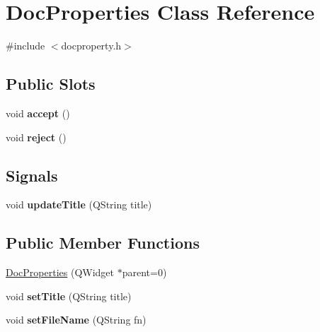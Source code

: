 \hypertarget{classDocProperties}{
\section{DocProperties Class Reference}
\label{classDocProperties}
}


{\ttfamily \#include $<$docproperty.h$>$}

\subsection*{Public Slots}
\begin{DoxyCompactItemize}
\item 
\hypertarget{classDocProperties_a64e18be0293c8c6e07e6d5f3356554d9}{
void {\bfseries accept} ()}
\label{classDocProperties_a64e18be0293c8c6e07e6d5f3356554d9}

\item 
\hypertarget{classDocProperties_a691527f79d1373fa3a1aea3e1e737f14}{
void {\bfseries reject} ()}
\label{classDocProperties_a691527f79d1373fa3a1aea3e1e737f14}

\end{DoxyCompactItemize}
\subsection*{Signals}
\begin{DoxyCompactItemize}
\item 
\hypertarget{classDocProperties_a875c8390f339820625aeb5e836d85aad}{
void {\bfseries updateTitle} (QString title)}
\label{classDocProperties_a875c8390f339820625aeb5e836d85aad}

\end{DoxyCompactItemize}
\subsection*{Public Member Functions}
\begin{DoxyCompactItemize}
\item 
\hyperlink{classDocProperties_a3c0e4378de507f79483dfb3fed05e8c6}{DocProperties} (QWidget $\ast$parent=0)
\item 
\hypertarget{classDocProperties_ae78fecbe1459251ef2ebd40ec4b75383}{
void {\bfseries setTitle} (QString title)}
\label{classDocProperties_ae78fecbe1459251ef2ebd40ec4b75383}

\item 
\hypertarget{classDocProperties_adf6519765c8f0dd0b70c489906c59015}{
void {\bfseries setFileName} (QString fn)}
\label{classDocProperties_adf6519765c8f0dd0b70c489906c59015}

\end{DoxyCompactItemize}


